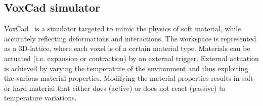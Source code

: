 \documentclass{sig-alternate}
\begin{document}
\newpage
\subsection{VoxCad simulator}
VoxCad~\cite{hiller2012dynamic} is a simulator targeted to mimic the physics of soft material, while accurately reflecting deformations and interactions. The workspace is represented as a 3D-lattice, where each voxel is of a certain material type. Materials can be actuated (i.e. expansion or contraction) by an external trigger. External actuation is achieved by varying the temperature of the environment and thus exploiting the various material properties. Modifying the material properties results in soft or hard material that either does (active) or does not  react (passive) to temperature variations.
\end{document}
